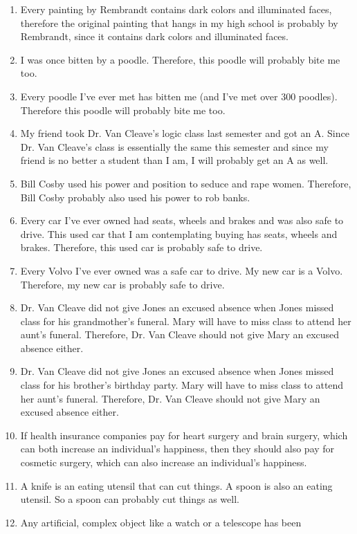 \begin{enumerate}
\item Every painting by Rembrandt contains dark colors and illuminated
faces, therefore the original painting that hangs in my high school is
probably by Rembrandt, since it contains dark colors and illuminated
faces.
\item I was once bitten by a poodle. Therefore, this poodle will probably
bite me too.
\item Every poodle I've ever met has bitten me (and I've met over 300
poodles). Therefore this poodle will probably bite me too.
\item My friend took Dr. Van Cleave's logic class last semester and got an A.
Since Dr. Van Cleave's class is essentially the same this semester and
since my friend is no better a student than I am, I will probably get an
A as well.
\item Bill Cosby used his power and position to seduce and rape women.
Therefore, Bill Cosby probably also used his power to rob banks.
\item Every car I've ever owned had seats, wheels and brakes and was also
safe to drive. This used car that I am contemplating buying has seats,
wheels and brakes. Therefore, this used car is probably safe to drive.
\item Every Volvo I've ever owned was a safe car to drive. My new car is a
Volvo. Therefore, my new car is probably safe to drive.
\item Dr. Van Cleave did not give Jones an excused absence when Jones
missed class for his grandmother's funeral. Mary will have to miss
class to attend her aunt's funeral. Therefore, Dr. Van Cleave should
not give Mary an excused absence either.
\item Dr. Van Cleave did not give Jones an excused absence when Jones
missed class for his brother's birthday party. Mary will have to miss
class to attend her aunt's funeral. Therefore, Dr. Van Cleave should
not give Mary an excused absence either.
\item If health insurance companies pay for heart surgery and brain surgery,
which can both increase an individual's happiness, then they should
also pay for cosmetic surgery, which can also increase an individual's
happiness.
\item A knife is an eating utensil that can cut things. A spoon is also an
eating utensil. So a spoon can probably cut things as well.
\item Any artificial, complex object like a watch or a telescope has been

\end{enumerate}
